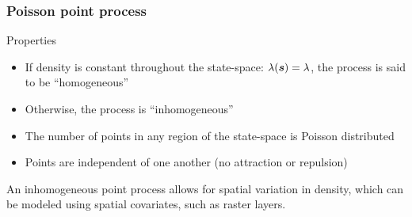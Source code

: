 \documentclass[color=usenames,dvipsnames]{beamer}\usepackage[]{graphicx}\usepackage[]{xcolor}
\begin{document}
\begin{frame}
  \frametitle{Poisson point process}
  Properties
  \begin{itemize}
    \item If density is constant throughout the state-space:
      $\lambda({\bm s}) = \lambda$, the process is said to be
      ``homogeneous''
    \item Otherwise, the process is ``inhomogeneous''
    \item The number of points in any region of the state-space is
      Poisson distributed
    \item Points are independent of one another (no attraction or
      repulsion) 
  \end{itemize}
  \pause
  \vfill
  An inhomogeneous point process allows for spatial variation
  in density, which can be modeled using \alert{spatial covariates},
  such as raster layers. \\
\end{frame}
\end{document}
